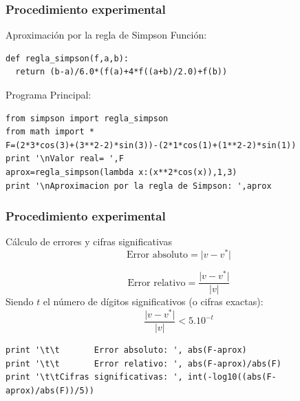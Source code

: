 \documentclass{beamer}
\begin{document}
\begin{frame}[fragile]

  \frametitle{Procedimiento experimental}
  
  \begin{block}{Aproximación por la regla de Simpson}
    Función:
      \begin{center}
        \begin{footnotesize}
          \begin{verbatim}
def regla_simpson(f,a,b):
  return (b-a)/6.0*(f(a)+4*f((a+b)/2.0)+f(b))
          \end{verbatim}
        \end{footnotesize}
      \end{center}
    Programa Principal:
      \begin{center}
        \begin{footnotesize}
          \begin{verbatim}
from simpson import regla_simpson
from math import *
F=(2*3*cos(3)+(3**2-2)*sin(3))-(2*1*cos(1)+(1**2-2)*sin(1))
print '\nValor real= ',F
aprox=regla_simpson(lambda x:(x**2*cos(x)),1,3)
print '\nAproximacion por la regla de Simpson: ',aprox
          \end{verbatim}
        \end{footnotesize}
      \end{center}
  \end{block}
  
\end{frame}
\begin{frame}[fragile]

  \frametitle{Procedimiento experimental}
  
  \begin{block}{Cálculo de errores y cifras significativas}
    \[\text{Error absoluto} = \vert v - v^* \vert\]

    \[\text{Error relativo} = \frac{\vert v - v^* \vert}{\vert v \vert}\]
    Siendo $t$ el número de dígitos significativos (o cifras exactas):
    \[\frac{\vert v - v^* \vert}{\vert v \vert} < 5.10^{-t}\] 
    
    \begin{center}
      \begin{footnotesize}
        \begin{verbatim}
print '\t\t       Error absoluto: ', abs(F-aprox)
print '\t\t       Error relativo: ', abs(F-aprox)/abs(F)
print '\t\tCifras significativas: ', int(-log10((abs(F-aprox)/abs(F))/5))
        \end{verbatim}
      \end{footnotesize}
    \end{center}
  \end{block}
  
\end{frame}
\end{document}
